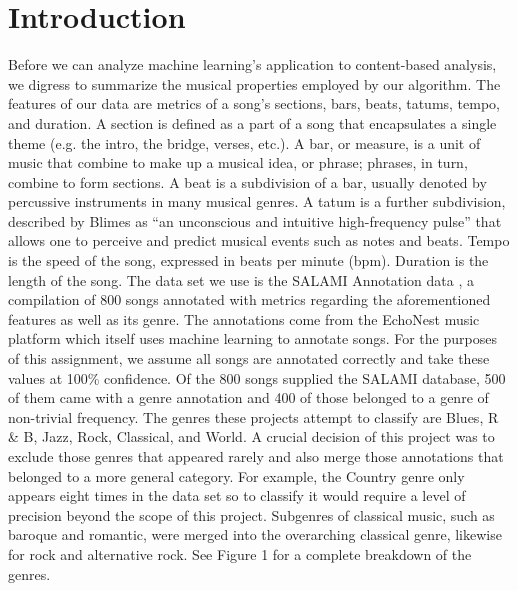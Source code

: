 \documentclass[11pt, twocolumn]{article}
\begin{document}
\section{Introduction}
    Before we can analyze machine learning’s application to content-based
analysis, we digress to summarize the musical properties employed by our
algorithm. The features of our data are metrics of a song’s sections, bars,
beats, tatums, tempo, and duration. A section is defined as a part of a song
that encapsulates a single theme (e.g. the intro, the bridge, verses, etc.). A
bar, or measure, is a unit of music that combine to make up a musical idea, or
phrase; phrases, in turn, combine to form sections. A beat is a subdivision of
a bar, usually denoted by percussive instruments in many musical genres. A
tatum is a further subdivision, described by Blimes \cite{blimes} as “an
unconscious and intuitive high-frequency pulse” that allows one to perceive
and predict musical events such as notes and beats. Tempo is the speed of the
song, expressed in beats per minute (bpm). Duration is the length of the song.
    The data set we use is the SALAMI Annotation data \cite{mcgill}, a
compilation of 800 songs annotated with metrics regarding the aforementioned
features as well as its genre. The annotations come from the EchoNest music
platform which itself uses machine learning to annotate songs. For the purposes
of this assignment, we assume all songs are annotated correctly and take these
values at 100\% confidence.
    Of the 800 songs supplied the SALAMI database, 500 of them came with a
genre  annotation and 400 of those belonged to a genre of non-trivial
frequency. The genres these projects attempt to classify are Blues, R \& B,
Jazz, Rock, Classical, and World. A crucial decision of this project was to
exclude those genres that appeared rarely and also merge those annotations that
belonged to a more general category. For example, the Country genre only
appears eight times in the data set so to classify it would require a level of
precision beyond the scope of this project. Subgenres of classical music, such
as baroque and romantic, were merged into the overarching classical genre,
likewise for rock and alternative rock. See Figure 1 for a complete breakdown
of the genres.
\end{document}

